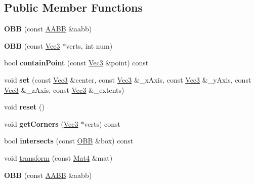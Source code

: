 \subsection*{Public Member Functions}
\begin{DoxyCompactItemize}
\item 
\mbox{\label{classOBB_ad991c58a1f319ce9925799aa4a247838}} 
{\bfseries O\+BB} (const \hyperlink{classAABB}{A\+A\+BB} \&aabb)
\item 
\mbox{\label{classOBB_a59d89f514c45a1008b42a0fb41f03094}} 
{\bfseries O\+BB} (const \hyperlink{classVec3}{Vec3} $\ast$verts, int num)
\item 
\mbox{\label{classOBB_a516fbb05199b8dd3ed82bc2a1497702b}} 
bool {\bfseries contain\+Point} (const \hyperlink{classVec3}{Vec3} \&point) const
\item 
\mbox{\label{classOBB_ae044e3ae729477346252e34b858be368}} 
void {\bfseries set} (const \hyperlink{classVec3}{Vec3} \&center, const \hyperlink{classVec3}{Vec3} \&\+\_\+x\+Axis, const \hyperlink{classVec3}{Vec3} \&\+\_\+y\+Axis, const \hyperlink{classVec3}{Vec3} \&\+\_\+z\+Axis, const \hyperlink{classVec3}{Vec3} \&\+\_\+extents)
\item 
\mbox{\label{classOBB_ae7bbc7ac460611a00e531a7c5832f352}} 
void {\bfseries reset} ()
\item 
\mbox{\label{classOBB_a195a8fcbcd765a5c2d546be1db7fede7}} 
void {\bfseries get\+Corners} (\hyperlink{classVec3}{Vec3} $\ast$verts) const
\item 
\mbox{\label{classOBB_a10d5595d178edbde5d0e96968f1148d0}} 
bool {\bfseries intersects} (const \hyperlink{classOBB}{O\+BB} \&box) const
\item 
void \hyperlink{classOBB_ad62eb091e1ad05d6b9b196f4bb4d94b7}{transform} (const \hyperlink{classMat4}{Mat4} \&mat)
\item 
\mbox{\label{classOBB_ad991c58a1f319ce9925799aa4a247838}} 
{\bfseries O\+BB} (const \hyperlink{classAABB}{A\+A\+BB} \&aabb)
\item 
\mbox{\label{classOBB_a59d89f514c45a1008b42a0fb41f03094}} 

\end{DoxyCompactItemize}
